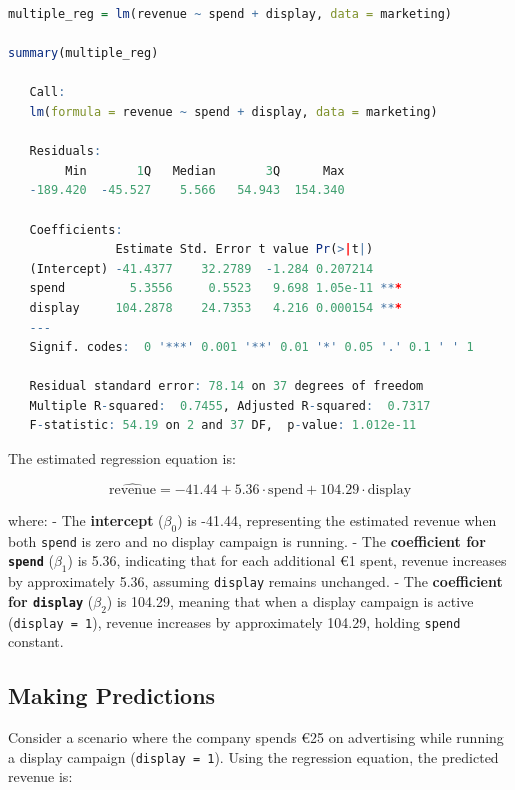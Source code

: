 \documentclass[
]{book}
\newcommand{\passthrough}[1]{#1}
\theoremstyle{definition}
\theoremstyle{definition}
\theoremstyle{definition}
\theoremstyle{definition}
\theoremstyle{remark}
\begin{document}
\begin{lstlisting}[language=R]
multiple_reg = lm(revenue ~ spend + display, data = marketing)

summary(multiple_reg)
   
   Call:
   lm(formula = revenue ~ spend + display, data = marketing)
   
   Residuals:
        Min       1Q   Median       3Q      Max 
   -189.420  -45.527    5.566   54.943  154.340 
   
   Coefficients:
               Estimate Std. Error t value Pr(>|t|)    
   (Intercept) -41.4377    32.2789  -1.284 0.207214    
   spend         5.3556     0.5523   9.698 1.05e-11 ***
   display     104.2878    24.7353   4.216 0.000154 ***
   ---
   Signif. codes:  0 '***' 0.001 '**' 0.01 '*' 0.05 '.' 0.1 ' ' 1
   
   Residual standard error: 78.14 on 37 degrees of freedom
   Multiple R-squared:  0.7455, Adjusted R-squared:  0.7317 
   F-statistic: 54.19 on 2 and 37 DF,  p-value: 1.012e-11
\end{lstlisting}

The estimated regression equation is:

\[
\hat{\text{revenue}} = -41.44 + 5.36 \cdot \text{spend} + 104.29 \cdot \text{display}
\]

where:
- The \textbf{intercept} (\(\beta_0\)) is -41.44, representing the estimated revenue when both \passthrough{\lstinline!spend!} is zero and no display campaign is running.
- The \textbf{coefficient for \passthrough{\lstinline!spend!}} (\(\beta_1\)) is 5.36, indicating that for each additional €1 spent, revenue increases by approximately 5.36, assuming \passthrough{\lstinline!display!} remains unchanged.
- The \textbf{coefficient for \passthrough{\lstinline!display!}} (\(\beta_2\)) is 104.29, meaning that when a display campaign is active (\passthrough{\lstinline!display = 1!}), revenue increases by approximately 104.29, holding \passthrough{\lstinline!spend!} constant.

\subsection*{Making Predictions}\label{making-predictions}

Consider a scenario where the company spends €25 on advertising while running a display campaign (\passthrough{\lstinline!display = 1!}). Using the regression equation, the predicted revenue is:
\end{document}
